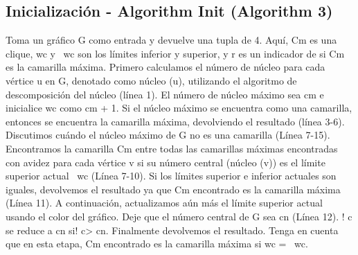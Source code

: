 \subsection{Inicialización - Algorithm Init (Algorithm 3)}

Toma un gráfico G como entrada y devuelve una tupla de 4. Aquí, Cm es una clique, wc y ~wc son los límites inferior y superior, y r es un indicador de si Cm es la camarilla máxima.
Primero calculamos el número de núcleo para cada vértice u en G, denotado como núcleo (u), utilizando el algoritmo de descomposición del núcleo (línea 1). El número de núcleo máximo sea cm e inicialice wc como cm + 1. Si el núcleo máximo se encuentra como una camarilla, entonces se encuentra la camarilla máxima, devolviendo el resultado (línea 3-6). Discutimos cuándo el núcleo máximo de G no es una camarilla (Línea 7-15). Encontramos la camarilla Cm entre todas las camarillas máximas encontradas con avidez para cada vértice v si su número central (núcleo (v)) es el límite superior actual ~wc (Línea 7-10). Si los límites superior e inferior actuales son iguales, devolvemos el resultado ya que Cm encontrado es la camarilla máxima (Línea 11). A continuación, actualizamos aún más el límite superior actual usando el color del gráfico. Deje que el número central de G sea cn (Línea 12). ! c se reduce a cn si! c> cn. Finalmente devolvemos el resultado. Tenga en cuenta que en esta etapa, Cm encontrado es la camarilla máxima si wc = ~wc.
\\
